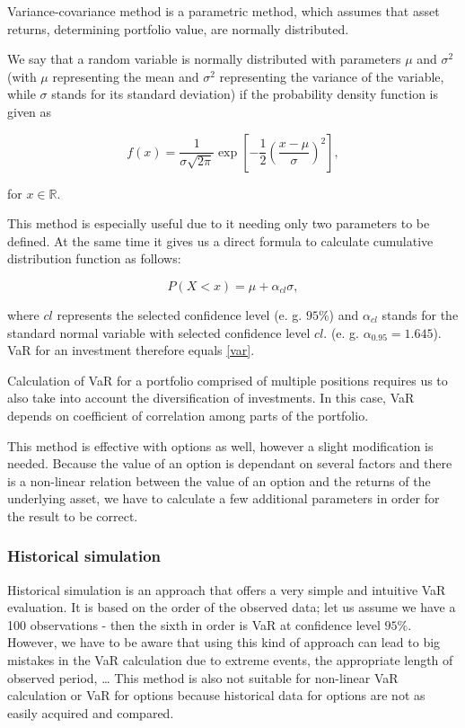 \documentclass[a4paper, 12pt]{article}
\theoremstyle{definition}
\theoremstyle{plain}
\theoremstyle{definition}
\newcommand{\R}{\mathbb R}
\begin{document}
Variance-covariance method is a parametric method, which assumes that asset returns, determining portfolio value,
are normally distributed.

We say that a random variable is normally distributed with parameters $\mu$ and $\sigma^2$ 
(with $\mu$ representing the mean and $\sigma^2$ representing the variance of the variable,  
while $\sigma$ stands for its standard deviation) if the probability density function is given as
 
\begin{equation}
    f(x) = \frac{1}{\sigma\sqrt{2\pi}}\exp\left[-\frac{1}{2}(\frac{x-\mu}{\sigma})^2\right],
\end{equation}

for $x\in \R$. 

This method is especially useful due to it needing only two parameters to be defined. 
At the same time it gives us a direct formula to calculate cumulative distribution function as follows:

\begin{equation}
    P(X<x) = \mu + \alpha_{cl}\sigma,
\end{equation}

where $cl$ represents the selected confidence level (e. g. $95\%$) and 
$\alpha_{cl}$ stands for the standard normal variable with selected confidence level $cl$.
(e. g. $\alpha_{0.95}=1.645$). 
VaR for an investment therefore equals \eqref{var}.

Calculation of VaR for a portfolio comprised of multiple positions 
requires us to also take into account the diversification of investments.
In this case, VaR depends on coefficient of correlation among parts of the portfolio.

This method is effective with options as well, however a slight modification is needed.
Because the value of an option is dependant on several factors and
there is a non-linear relation between the value of an option and 
the returns of the underlying asset, we have to calculate a few additional parameters in 
order for the result to be correct.


\subsubsection{Historical simulation}

Historical simulation is an approach that offers a very simple and intuitive VaR evaluation.
It is based on the order of the observed data;
let us assume we have a 100 observations - then the sixth in order is VaR at 
confidence level $95\%$.
However, we have to be aware that using this kind of approach can lead to 
big mistakes in the VaR calculation due to extreme events, the appropriate length of observed period, \dots
This method is also not suitable for non-linear VaR calculation or VaR for options
because historical data for options are not as easily acquired and compared.
\end{document}
